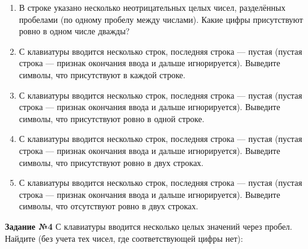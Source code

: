 \begin{enumerate}
\item В строке указано несколько неотрицательных целых чисел, разделённых пробелами (по одному
пробелу между числами). Какие цифры присутствуют ровно в одном числе дважды?

\item С клавиатуры вводится несколько строк, последняя строка — пустая (пустая строка — признак окончания ввода и дальше игнорируется). Выведите символы, что присутствуют в каждой строке.

\item С клавиатуры вводится несколько строк, последняя строка — пустая (пустая строка — признак окончания ввода и дальше игнорируется). Выведите символы, что присутствуют ровно в одной строке.

\item С клавиатуры вводится несколько строк, последняя строка — пустая (пустая строка — признак окончания ввода и дальше игнорируется). Выведите символы, что присутствуют ровно в двух строках.

\item С клавиатуры вводится несколько строк, последняя строка — пустая (пустая строка — признак окончания ввода и дальше игнорируется). Выведите символы, что отсутствуют ровно в двух строках.

\end{enumerate}

\textbf{Задание №4} С клавиатуры вводится несколько целых значений через пробел. Найдите (без учета тех чисел, где соответствующей цифры нет):

